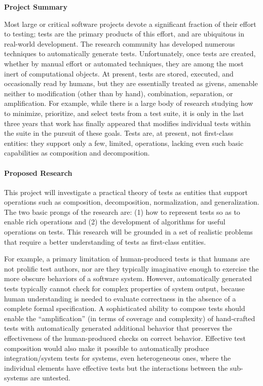 \begin{center}
{\Large\sf\textbf{Project Summary\\\fulltitle{}}}
\end{center}

Most large or critical software projects devote a significant
fraction of their effort to testing; tests are the primary products of
this effort, and are ubiquitous in real-world development.  The
research community has developed numerous techniques to automatically
generate tests.  Unfortunately, once tests are created, whether by
manual effort or automated techniques, they are among the most inert
of computational objects.  At present, tests are stored, executed, and
occasionally read by humans, but they are essentially treated as
givens, amenable neither to modification (other than by hand),
combination, separation, or amplification.  For example, while there
is a large body of research studying how to minimize, prioritize, and
select tests from a test suite, it is only in the last three years
that work has finally appeared that modifies individual tests within
the suite in the pursuit of these goals.  Tests are, at present, not
first-class entities: they support only a few, limited, operations,
lacking even such basic capabilities as composition and decomposition.

\paragraph{Proposed Research}

This project will investigate a practical theory of tests as entities
that support operations such as composition, decomposition,
normalization, and generalization. The two basic prongs of the
research are: (1) how to represent tests so as to enable rich
operations and (2) the development of algorithms for useful operations
on tests.  This research will be grounded in a set of realistic
problems that require a better understanding of tests as first-class
entities.

For example, a primary limitation of human-produced tests is that
humans are not prolific test authors, nor are they typically
imaginative enough to exercise the more obscure behaviors of a
software system. However, automatically generated tests typically
cannot check for complex properties of system output, because human
understanding is needed to evaluate correctness in the absence of a
complete formal specification.  A sophisticated ability to compose
tests should enable the ``amplification'' (in terms of coverage and
complexity) of hand-crafted tests with automatically generated
additional behavior that preserves the effectiveness of the
human-produced checks on correct behavior.  Effective test composition
would also make it possible to automatically produce integration/system tests for
systems, even heterogeneous ones, where the individual elements have
effective tests but the interactions between the sub-systems are untested.

